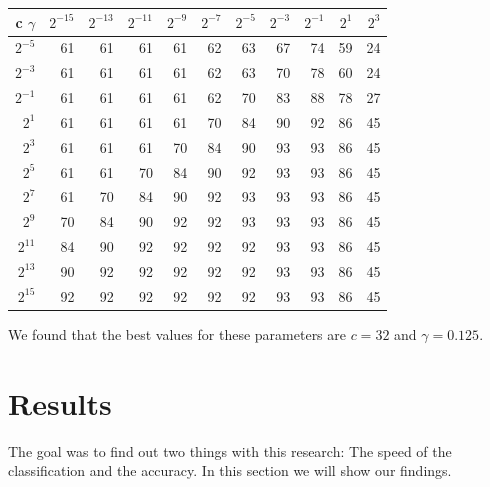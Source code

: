 \documentclass[a4paper]{article}
\begin{document}
\begin{tabular}{|r|r r r r r r r r r r|}
\hline
c $\gamma$ & $2^{-15}$ & $2^{-13}$ & $2^{-11}$ & $2^{-9}$ & $2^{-7}$ &
	$2^{-5}$ & $2^{-3}$ & $2^{-1}$ & $2^{1}$ & $2^{3}$\\
\hline
$2^{-5}$ &       61 &       61 &       61 &       61 &       62 &
       63 &       67 &       74 &       59 &       24\\
$2^{-3}$ &       61 &       61 &       61 &       61 &       62 &
       63 &       70 &       78 &       60 &       24\\
$2^{-1}$ &       61 &       61 &       61 &       61 &       62 &
       70 &       83 &       88 &       78 &       27\\
 $2^{1}$ &       61 &       61 &       61 &       61 &       70 &
        84 &       90 &       92 &       86 &       45\\
 $2^{3}$ &       61 &       61 &       61 &       70 &       84 &
        90 &       93 &       93 &       86 &       45\\
 $2^{5}$ &       61 &       61 &       70 &       84 &       90 &
        92 &       93 &       93 &       86 &       45\\
 $2^{7}$ &       61 &       70 &       84 &       90 &       92 &
        93 &       93 &       93 &       86 &       45\\
 $2^{9}$ &       70 &       84 &       90 &       92 &       92 &
       93 &       93 &       93 &       86 &       45\\
$2^{11}$ &       84 &       90 &       92 &       92 &       92 &
       92 &       93 &       93 &       86 &       45\\
$2^{13}$ &       90 &       92 &       92 &       92 &       92 &
       92 &       93 &       93 &       86 &       45\\
$2^{15}$ &       92 &       92 &       92 &       92 &       92 &
       92 &       93 &       93 &       86 &       45\\
\hline
\end{tabular}

We found that the best values for these parameters are $c = 32$ and
$\gamma = 0.125$.

\section{Results}

The goal was to find out two things with this research: The speed of the
classification and the accuracy. In this section we will show our findings.
\end{document}
